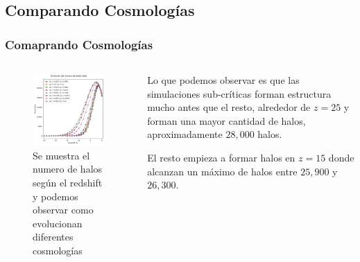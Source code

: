\documentclass{beamer}
\begin{document}
\subsection{Comparando Cosmologías}
	\begin{frame}
		\frametitle{Comaprando Cosmologías}
		\begin{columns}[t]
           	\begin{column}{.5\textwidth}

				\begin{figure}
					\centering
					\includegraphics[scale=0.31]{Conc/TotalHalos_Conc.png}
					\caption{\footnotesize Se muestra el numero de halos según el redshift y podemos observar como evolucionan diferentes cosmologías }
					\label{fig:TotalHalos_Conc}
				\end{figure}

	        \end{column}
    	    \begin{column}{.5\textwidth}

    	    	Lo que podemos observar es que las simulaciones sub-críticas forman estructura mucho antes que el resto, alrededor de $z=25$ y forman una mayor cantidad de halos, aproximadamente $28,000$ halos.
    	    	
    	    	El resto empieza a formar halos en $z=15$ donde alcanzan un máximo de halos entre $25,900$ y $26,300$.

        	\end{column}
	    \end{columns}

	\end{frame}
\end{document}
